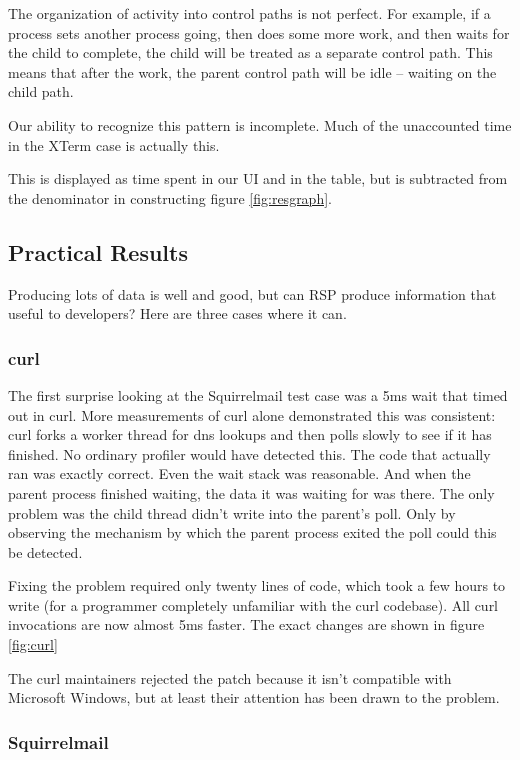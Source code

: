 \documentclass[10pt]{article}
\begin{document}
The organization of activity into control paths is not perfect.  For example, if a process sets another process going, then does some more work, and then waits for the child to complete, the child will be treated as a separate control path.  This means that after the work, the parent control path will be idle -- waiting on the child path.

Our ability to recognize this pattern is incomplete.  Much of the unaccounted time in the XTerm case is actually this.

This is displayed as time spent in our UI and in the table, but is subtracted from the denominator in constructing figure \ref{fig:resgraph}.

\subsection{Practical Results}

Producing lots of data is well and good, but can RSP produce information that useful to developers?  Here are three cases where it can.

\subsubsection{curl}

The first surprise looking at the Squirrelmail test case was a 5ms wait that timed out in curl.  More measurements of curl alone demonstrated this was consistent: curl forks a worker thread for dns lookups and then polls slowly to see if it has finished.  No ordinary profiler would have detected this.  The code that actually ran was exactly correct.  Even the wait stack was reasonable.  And when the parent process finished waiting, the data it was waiting for was there.  The only problem was the child thread didn't write into the parent's poll.  Only by observing the mechanism by which the parent process exited the poll could this be detected.

Fixing the problem required only twenty lines of code, which took a few hours to write (for a programmer completely unfamiliar with the curl codebase).  All curl invocations are now almost 5ms faster.  The exact changes are shown in figure \ref{fig:curl}

The curl maintainers rejected the patch because it isn't compatible with Microsoft Windows, but at least their attention has been drawn to the problem.

\subsubsection{Squirrelmail}
\end{document}
